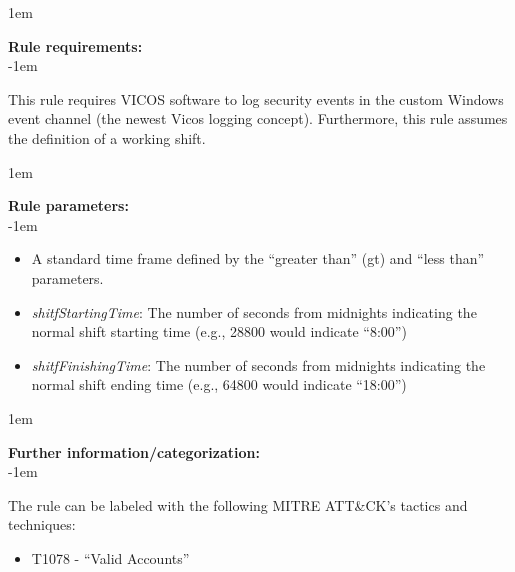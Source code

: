 \openup 1em

{\bf Rule requirements:} \\

\openup -1em
\vspace{-2em}

This rule requires VICOS software to log security events in the custom Windows event channel (the newest Vicos logging concept). Furthermore, this rule assumes the definition of a working shift.

\openup 1em

{\bf Rule parameters:} \\

\openup -1em
\vspace{-2em}

\begin{itemize}
	\item A standard time frame defined by the ``greater than'' (gt) and ``less than'' parameters.
	\item \emph{shitfStartingTime}: The number of seconds from midnights indicating the normal shift starting time (e.g., 28800 would indicate ``8:00'')
	\item \emph{shitfFinishingTime}: The number of seconds from midnights indicating the normal shift ending time (e.g., 64800 would indicate ``18:00'')
\end{itemize}

\openup 1em

{\bf Further information/categorization:} \\

\openup -1em
\vspace{-2em}


The rule can be labeled with the following MITRE ATT\&CK's tactics and techniques:
\begin{itemize}
	\item T1078 - ``Valid Accounts''
\end{itemize}

\pagebreak

